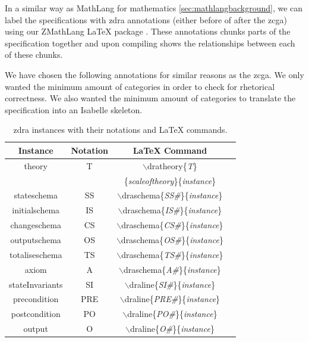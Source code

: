 In a similar way as  MathLang for mathematics \ref{sec:mathlangbackground}, we can label the specifications with
\gls{zdra} annotations (either before of after the \gls{zcga}) using our ZMathLang \LaTeX{} package . These
annotations chunks parts of the specification together and upon compiling shows
the relationships between each of these chunks.

We have chosen the following annotations for similar reasons as the \gls{zcga}.
We only wanted the minimum amount of categories in order to check for rhetorical
correctness. We also wanted the minimum amount of categories to translate the
specification into an Isabelle skeleton.

\begin{table}[H]
\begin{tabular}{| c | c | c | c |}
\hline
\textbf{Instance} & \textbf{Notation} & \textbf{\LaTeX{} Command}  \\
\hline
theory & T & $\backslash$dratheory\{\textit{T}\}\\
& & \{\textit{scaleoftheory}\}\{\textit{instance}\}  \\
\hline
stateschema & SS & $\backslash$draschema\{\textit{SS\#}\}\{\textit{instance}\}
\\
\hline
initialschema & IS & $\backslash$draschema\{\textit{IS\#}\}\{\textit{instance}\}
\\
\hline
changeschema & CS & $\backslash$draschema\{\textit{CS\#}\}\{\textit{instance}\}
\\
\hline
outputschema & OS & $\backslash$draschema\{\textit{OS\#}\}\{\textit{instance}\}
\\
\hline
totaliseschema & TS &
$\backslash$draschema\{\textit{TS\#}\}\{\textit{instance}\}  \\
\hline
axiom & A  & $\backslash$draschema\{\textit{A\#}\}\{\textit{instance}\}  \\
\hline
stateInvariants & SI & $\backslash$draline\{\textit{SI\#}\}\{\textit{instance}\}
\\
\hline
precondition & PRE & $\backslash$draline\{\textit{PRE\#}\}\{\textit{instance}\}
\\
\hline
postcondition & PO  & $\backslash$draline\{\textit{PO\#}\}\{\textit{instance}\}
\\
\hline
output & O  & $\backslash$draline\{\textit{O\#}\}\{\textit{instance}\}  \\
\hline
\end{tabular}
\caption{\label{tab:instances} \gls{zdra} instances with their notations and \LaTeX{} commands.}
\end{table}

